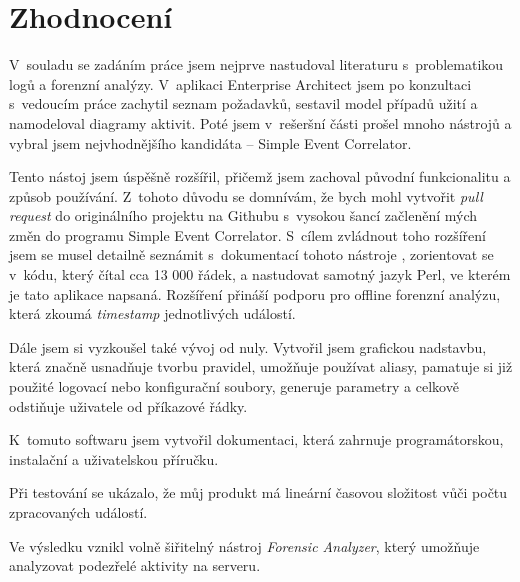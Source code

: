 \documentclass[thesis=B,czech]{FITthesis}[2012/06/26]
\begin{document}
\chapter{Zhodnocení}
V~souladu se zadáním práce jsem nejprve nastudoval literaturu s~problematikou logů a forenzní analýzy. V~aplikaci Enterprise Architect jsem po konzultaci s~vedoucím práce zachytil seznam požadavků, sestavil model případů užití a namodeloval diagramy aktivit. Poté jsem v~rešeršní části prošel mnoho nástrojů a vybral jsem nejvhodnějšího kandidáta -- Simple Event Correlator. 

Tento nástoj jsem úspěšně rozšířil, přičemž jsem zachoval původní funkcionalitu a způsob používání. Z~tohoto důvodu se domnívám, že bych mohl vytvořit \textit{pull request} do originálního projektu na Githubu s~vysokou šancí začlenění mých změn do programu Simple Event Correlator. S~cílem zvládnout toho rozšíření jsem se musel detailně seznámit s~dokumentací tohoto nástroje \cite{secManPage}, zorientovat se v~kódu, který čítal cca 13 000 řádek, a nastudovat samotný jazyk Perl, ve kterém je tato aplikace napsaná.
Rozšíření přináší podporu pro offline forenzní analýzu, která zkoumá \textit{timestamp} jednotlivých událostí.

Dále jsem si vyzkoušel také vývoj od nuly. Vytvořil jsem grafickou nadstavbu, která značně usnadňuje tvorbu pravidel, umožňuje používat aliasy, pamatuje si již použité logovací nebo konfigurační soubory, generuje parametry a celkově odstiňuje uživatele od příkazové řádky.

K~tomuto softwaru jsem vytvořil dokumentaci, která zahrnuje programátorskou, instalační a uživatelskou příručku. 

Při testování se ukázalo, že můj produkt má lineární časovou složitost vůči počtu zpracovaných událostí.

Ve výsledku vznikl volně šiřitelný nástroj \textit{Forensic Analyzer}, který umožňuje analyzovat podezřelé aktivity na serveru. 
\end{document}
